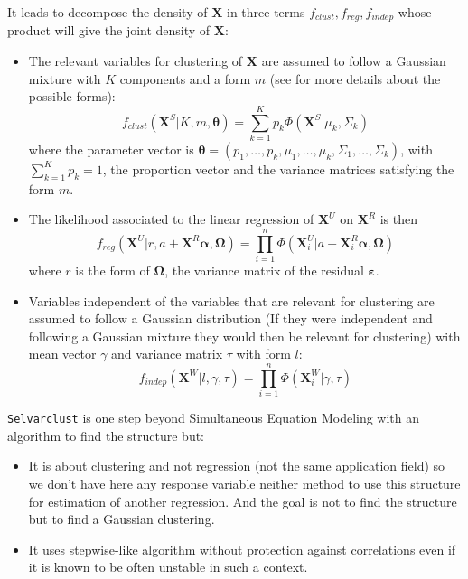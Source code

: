 \documentclass[12pt,a4paper]{report}
\begin{document}
It leads to decompose the density of $\boldsymbol{X}$ in three terms $f_{clust},f_{reg},f_{indep}$ whose product will give the joint density of $\boldsymbol{X}$:
\begin{itemize}
	\item The relevant variables for clustering of $\boldsymbol{X}$ are assumed to follow a Gaussian mixture with $K$ components and a form $m$ (see \cite{biernacki2006model} for more details about the possible forms):
	\begin{equation}
		f_{clust}(\boldsymbol{X}^S|K,m,\boldsymbol{\theta})=\sum_{k=1}^K p_k \Phi (\boldsymbol{X}^S|\mu_k,\Sigma_k)
	\end{equation}
	where the parameter vector is $\boldsymbol{\theta}=(p_1,\dots,p_k,\mu_1,\dots,\mu_k,\Sigma_1,\dots,\Sigma_k)$, with $\sum_{k=1}^K p_k=1$, the proportion vector and the variance matrices satisfying the form $m$.
	\item The likelihood associated to the linear regression of $\boldsymbol{X}^U$ on $\boldsymbol{X}^R$ is then
	\begin{equation}
		f_{reg}(\boldsymbol{X}^U|r,a+\boldsymbol{X}^R\boldsymbol{\alpha},\boldsymbol{\Omega})=\prod_{i=1}^n \Phi(\boldsymbol{X}_i^U|a+\boldsymbol{X}_i^R \boldsymbol{\alpha},\boldsymbol{\Omega})
	\end{equation}
	where $r$ is the form of $\boldsymbol{\Omega}$, the variance matrix of the residual $\boldsymbol{\varepsilon}$.
	\item Variables independent of the variables that are relevant for clustering are assumed to follow a Gaussian distribution (If they were independent and following a Gaussian mixture they would then be relevant for clustering) with mean vector $\gamma$ and variance matrix $\tau$ with form $l$:
	\begin{equation}
		f_{indep}(\boldsymbol{X}^{W}|l,\gamma,\tau)=\prod_{i=1}^n \Phi (\boldsymbol{X}_i^W|\gamma,\tau)
	\end{equation}
\end{itemize}


{\tt Selvarclust} is one step beyond Simultaneous Equation Modeling with an algorithm to find the structure but:
			\begin{itemize}
				\item It is about clustering and not regression (not the same application field) so we don't have here any response variable neither method to use this structure for estimation of another regression.  And the goal is not to find the structure but to find a Gaussian clustering.
				\item It uses stepwise-like algorithm without protection against correlations \cite{raftery2006variable} even if it is known to be often unstable \cite{miller2002subset} in such a context.
			\end{itemize}
			
\end{document}
